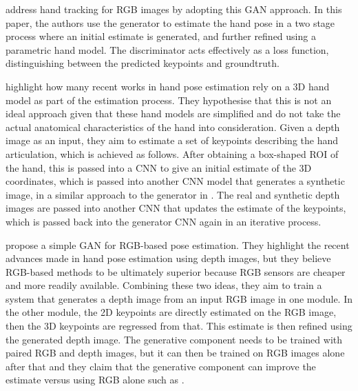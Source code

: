 \cite{he2019graphposegan} address hand tracking for RGB images by adopting this GAN approach. In this paper, the authors use the generator to estimate the hand pose in a two stage process where an initial estimate is generated, and further refined using a parametric hand model. The discriminator acts effectively as a loss function, distinguishing between the predicted keypoints and groundtruth.

\cite{oberweger2019generalized} highlight how many recent works in hand pose estimation rely on a 3D hand model as part of the estimation process. They hypothesise that this is not an ideal approach given that these hand models are simplified and do not take the actual anatomical characteristics of the hand into consideration. Given a depth image as an input, they aim to estimate a set of keypoints describing the hand articulation, which is achieved as follows. After obtaining a box-shaped ROI of the hand, this is passed into a CNN to give an initial estimate of the 3D coordinates, which is passed into another CNN model that generates a synthetic image, in a similar approach to the generator in \cite{he2019graphposegan}. The real and synthetic depth images are passed into another CNN that updates the estimate of the keypoints, which is passed back into the generator CNN again in an iterative process.

\cite{chen2020dggan} propose a simple GAN for RGB-based pose estimation. They highlight the recent advances made in hand pose estimation using depth images, but they believe RGB-based methods to be ultimately superior because RGB sensors are cheaper and more readily available. Combining these two ideas, they aim to train a system that generates a depth image from an input RGB image in one module. In the other module, the 2D keypoints are directly estimated on the RGB image, then the 3D keypoints are regressed from that. This estimate is then refined using the generated depth image. The generative component needs to be trained with paired RGB and depth images, but it can then be trained on RGB images alone after that and they claim that the generative component can improve the estimate versus using RGB alone such as \cite{wang2018mask}.

